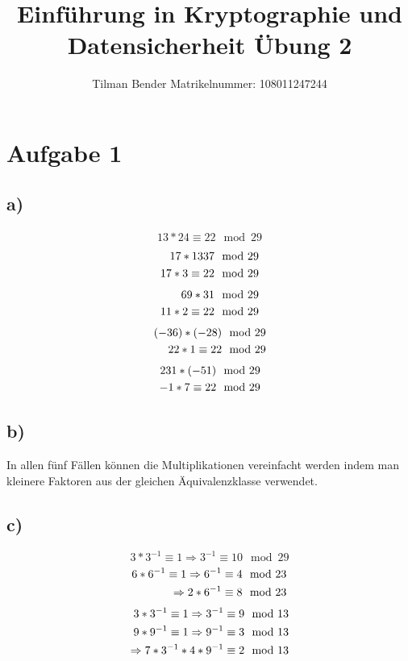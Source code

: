\documentclass[10pt,a4paper]{article}
\author{Tilman Bender   Matrikelnummer: 108011247244\\}
\title{Einführung in Kryptographie und Datensicherheit Übung 2}
\begin{document}
\maketitle

\section*{Aufgabe 1}
\subsection*{a)}
\renewcommand{\theequation}{\roman{equation}}
\begin{align} 
13*24 \equiv 22 \mod 29 
\end{align}
\begin{align} 
17 * 1337 \mod 29 \notag\\
17 * 3 \equiv 22 \mod 29 \end
{align}
\begin{align} 
69 * 31\mod 29 \notag \\
11 * 2  \equiv 22 \mod 29 \end{align}
\begin{align}  
(-36)*(-28) \mod 29 \notag \\
22 * 1 \equiv 22 \mod 29 \end{align}
\begin{align}
231 * (-51) \mod29  \notag \\
-1 * 7 \equiv 22 \mod 29
 \end{align}
\subsection*{b)}
In allen fünf Fällen können die Multiplikationen vereinfacht werden indem man kleinere Faktoren aus der gleichen Äquivalenzklasse verwendet.
\subsection*{c)}
\setcounter{equation}{0}
\begin{equation}  3 * 3^{-1} \equiv 1 \Rightarrow 3^{-1} \equiv 10 \mod 29 \end{equation}
\begin{align}   6 * 6^{-1} \equiv 1 \Rightarrow 6^{-1} \equiv 4 \mod 23 \notag\\
 \Rightarrow 2 * 6^{-1} \equiv 8 \mod 23 \end{align}
\begin{align}   
3*3^{-1} \equiv 1\Rightarrow 3^{-1} \equiv 9 \mod 13 \notag \\
9*9^{-1} \equiv 1 \Rightarrow 9^{-1} \equiv  3 \mod 13\\
\Rightarrow 7*3^{-1}*4*9^{-1} \equiv 2 \mod 13 \notag
\end{align}
\end{document}
